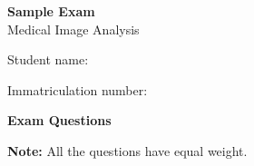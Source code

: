 \documentclass[11pt]{exam}
\begin{document}
\begin{center}
  {\LARGE\bfseries Sample Exam}\\[2mm]
  {\Large Medical Image Analysis}\\[6mm]
\end{center}

\vspace{4mm}
\noindent Student name:\hrulefill

\vspace{6mm}
\noindent Immatriculation number:\hrulefill

\vspace{10mm}

\begin{center}
  {\large\bfseries Exam Questions}
\end{center}

\noindent\textbf{Note:} All the questions have equal weight.

\vspace{4mm}
\end{document}

